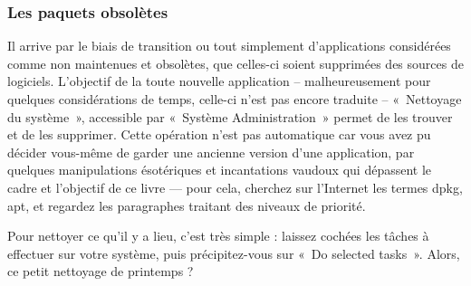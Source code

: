 {\subsubsection{Les paquets obsolètes}
\label{RefCleaner}
Il arrive par le biais de transition ou tout simplement d'applications considérées comme non maintenues et obsolètes, que celles-ci soient supprimées des sources de logiciels. L'objectif de la toute nouvelle application -- malheureusement pour quelques considérations de temps, celle-ci n'est pas encore traduite -- «~Nettoyage du système~», accessible par «~Système \FlecheDroite Administration~» permet de les trouver et de les supprimer. Cette opération n'est pas automatique car vous avez pu décider vous-même de garder une ancienne version d'une application, par quelques manipulations ésotériques et incantations vaudoux qui dépassent le cadre et l'objectif de ce livre --- pour cela, cherchez sur l'Internet les termes dpkg, apt, et regardez les paragraphes traitant des niveaux de priorité.\par
Pour nettoyer ce qu'il y a lieu, c'est très simple : laissez cochées les tâches à effectuer sur votre système, puis précipitez-vous sur «~Do selected tasks~». Alors, ce petit nettoyage de printemps ?
}
